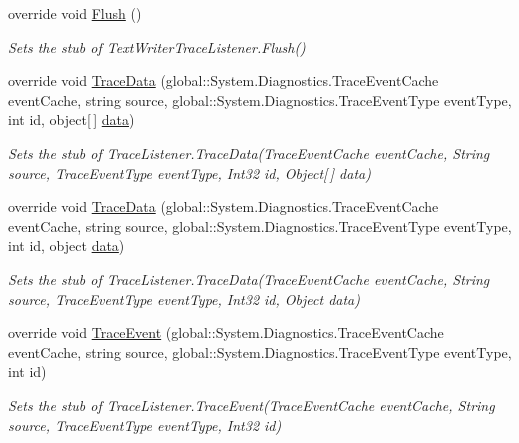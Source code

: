 \begin{DoxyCompactItemize}
override void \hyperlink{class_system_1_1_diagnostics_1_1_fakes_1_1_stub_text_writer_trace_listener_a94e76a8723d8303af608abaaffcad27a}{Flush} ()
\begin{DoxyCompactList}\small\item\em Sets the stub of Text\-Writer\-Trace\-Listener.\-Flush()\end{DoxyCompactList}\item 
override void \hyperlink{class_system_1_1_diagnostics_1_1_fakes_1_1_stub_text_writer_trace_listener_a764cf4f265d74a0dac4ad0d3080001bd}{Trace\-Data} (global\-::\-System.\-Diagnostics.\-Trace\-Event\-Cache event\-Cache, string source, global\-::\-System.\-Diagnostics.\-Trace\-Event\-Type event\-Type, int id, object\mbox{[}$\,$\mbox{]} \hyperlink{jquery-1_810_82-vsdoc_8js_a609407b3456fdc3c5671a9fc4a226ff7}{data})
\begin{DoxyCompactList}\small\item\em Sets the stub of Trace\-Listener.\-Trace\-Data(\-Trace\-Event\-Cache event\-Cache, String source, Trace\-Event\-Type event\-Type, Int32 id, Object\mbox{[}$\,$\mbox{]} data)\end{DoxyCompactList}\item 
override void \hyperlink{class_system_1_1_diagnostics_1_1_fakes_1_1_stub_text_writer_trace_listener_a83b209300bd485f7d1e0f3f0f93fdc3b}{Trace\-Data} (global\-::\-System.\-Diagnostics.\-Trace\-Event\-Cache event\-Cache, string source, global\-::\-System.\-Diagnostics.\-Trace\-Event\-Type event\-Type, int id, object \hyperlink{jquery-1_810_82-vsdoc_8js_a609407b3456fdc3c5671a9fc4a226ff7}{data})
\begin{DoxyCompactList}\small\item\em Sets the stub of Trace\-Listener.\-Trace\-Data(\-Trace\-Event\-Cache event\-Cache, String source, Trace\-Event\-Type event\-Type, Int32 id, Object data)\end{DoxyCompactList}\item 
override void \hyperlink{class_system_1_1_diagnostics_1_1_fakes_1_1_stub_text_writer_trace_listener_a4139bd33926587a86956cf37855d5b09}{Trace\-Event} (global\-::\-System.\-Diagnostics.\-Trace\-Event\-Cache event\-Cache, string source, global\-::\-System.\-Diagnostics.\-Trace\-Event\-Type event\-Type, int id)
\begin{DoxyCompactList}\small\item\em Sets the stub of Trace\-Listener.\-Trace\-Event(\-Trace\-Event\-Cache event\-Cache, String source, Trace\-Event\-Type event\-Type, Int32 id)\end{DoxyCompactList}\item 

\end{DoxyCompactItemize}
